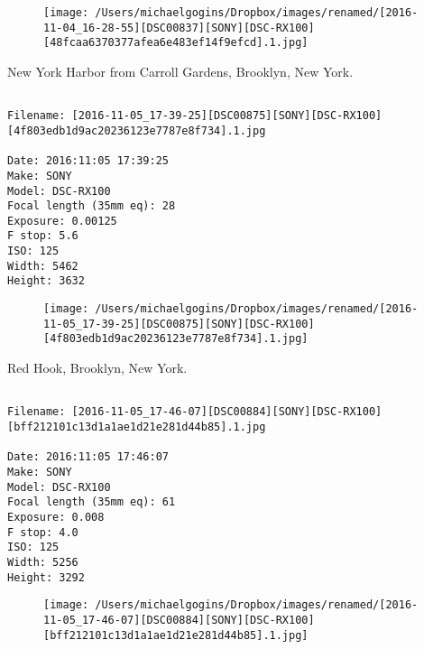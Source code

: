 \begin{figure}
\texttt{[image: /Users/michaelgogins/Dropbox/images/renamed/[2016-11-04\_16-28-55][DSC00837][SONY][DSC-RX100][48fcaa6370377afea6e483ef14f9efcd].1.jpg]}
\end{figure}
    
\clearpage
\onecolumn
\noindent New York Harbor from Carroll Gardens, Brooklyn, New York.
\noindent
\begin{lstlisting}

Filename: [2016-11-05_17-39-25][DSC00875][SONY][DSC-RX100][4f803edb1d9ac20236123e7787e8f734].1.jpg

Date: 2016:11:05 17:39:25
Make: SONY
Model: DSC-RX100
Focal length (35mm eq): 28
Exposure: 0.00125
F stop: 5.6
ISO: 125
Width: 5462
Height: 3632
\end{lstlisting}
\clearpage

\begin{figure}
\texttt{[image: /Users/michaelgogins/Dropbox/images/renamed/[2016-11-05\_17-39-25][DSC00875][SONY][DSC-RX100][4f803edb1d9ac20236123e7787e8f734].1.jpg]}
\end{figure}
    
\clearpage
\onecolumn
\noindent Red Hook, Brooklyn, New York.
\noindent
\begin{lstlisting}

Filename: [2016-11-05_17-46-07][DSC00884][SONY][DSC-RX100][bff212101c13d1a1ae1d21e281d44b85].1.jpg

Date: 2016:11:05 17:46:07
Make: SONY
Model: DSC-RX100
Focal length (35mm eq): 61
Exposure: 0.008
F stop: 4.0
ISO: 125
Width: 5256
Height: 3292
\end{lstlisting}
\clearpage

\begin{figure}
\texttt{[image: /Users/michaelgogins/Dropbox/images/renamed/[2016-11-05\_17-46-07][DSC00884][SONY][DSC-RX100][bff212101c13d1a1ae1d21e281d44b85].1.jpg]}
\end{figure}
    
